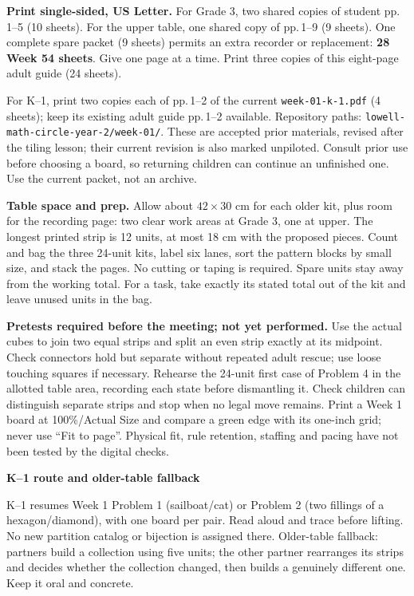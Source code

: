 \documentclass[letterpaper,11pt]{article}
\newcommand{\subhead}[1]{\vspace{3pt}\textbf{#1}\par}
\begin{document}
\textbf{Print single-sided, US Letter.} For Grade 3, two shared copies of student pp.\,1--5 (10 sheets). For the upper table, one shared copy of pp.\,1--9 (9 sheets). One complete spare packet (9 sheets) permits an extra recorder or replacement: \textbf{28 Week 54 sheets}. Give one page at a time. Print three copies of this eight-page adult guide (24 sheets).

For K--1, print two copies each of pp.\,1--2 of the current \nolinkurl{week-01-k-1.pdf} (4 sheets); keep its existing adult guide pp.\,1--2 available. Repository paths: \nolinkurl{lowell-math-circle-year-2/week-01/}. These are accepted prior materials, revised after the tiling lesson; their current revision is also marked unpiloted. Consult prior use before choosing a board, so returning children can continue an unfinished one. Use the current packet, not an archive.

\textbf{Table space and prep.} Allow about $42\times30$ cm for each older kit, plus room for the recording page: two clear work areas at Grade 3, one at upper. The longest printed strip is 12 units, at most 18 cm with the proposed pieces. Count and bag the three 24-unit kits, label six lanes, sort the pattern blocks by small size, and stack the pages. No cutting or taping is required. Spare units stay away from the working total. For a task, take exactly its stated total out of the kit and leave unused units in the bag.

\textbf{Pretests required before the meeting; not yet performed.} Use the actual cubes to join two equal strips and split an even strip exactly at its midpoint. Check connectors hold but separate without repeated adult rescue; use loose touching squares if necessary. Rehearse the 24-unit first case of Problem 4 in the allotted table area, recording each state before dismantling it. Check children can distinguish separate strips and stop when no legal move remains. Print a Week 1 board at 100\%/Actual Size and compare a green edge with its one-inch grid; never use ``Fit to page''. Physical fit, rule retention, staffing and pacing have not been tested by the digital checks.

\subhead{K--1 route and older-table fallback}
K--1 resumes Week 1 Problem 1 (sailboat/cat) or Problem 2 (two fillings of a hexagon/diamond), with one board per pair. Read aloud and trace before lifting. No new partition catalog or bijection is assigned there. Older-table fallback: partners build a collection using five units; the other partner rearranges its strips and decides whether the collection changed, then builds a genuinely different one. Keep it oral and concrete.
\newpage
\end{document}

